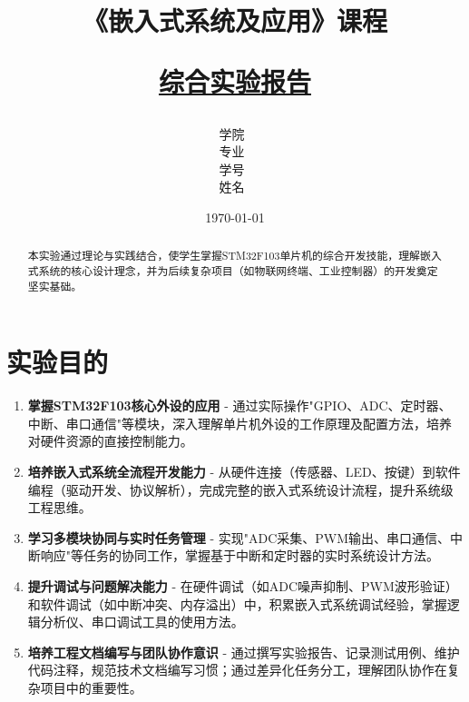 \documentclass[12pt,hyperref,a4paper,twoside,UTF8]{ctexart}
\title{ 
        \vspace{1cm}
        \heiti \Huge \textbf{《嵌入式系统及应用》课程} \par
        \vspace{1cm} 
        \heiti \Large {\underline{综合实验报告}}    
        \vspace{3cm}
    }
\author{
        \vspace{0.5cm}
        \kaishu\Large 学院\ \dlmu[9cm]{仪器科学与光电工程学院} \\ %
        \vspace{0.5cm}
        \kaishu\Large 专业\ \dlmu[9cm]{光电信息工程} \\ %
        \vspace{0.5cm}
        \kaishu\Large 学号\ \dlmu[9cm]{2024XXXXXX} \qquad  \\ %
        \vspace{0.5cm}
        \kaishu\Large 姓名\ \dlmu[9cm]{XXX} \qquad \\ %
    }
\date{\today} %
\begin{document}
\cover
\thispagestyle{empty} %
\newpage
\begin{abstract}

本实验通过理论与实践结合，使学生掌握STM32F103单片机的综合开发技能，理解嵌入式系统的核心设计理念，并为后续复杂项目（如物联网终端、工业控制器）的开发奠定坚实基础。

\end{abstract}

\thispagestyle{empty} %

\newpage
\tableofcontents

\newpage
\setcounter{page}{1} %


\section{实验目的}


\begin{enumerate}[label=\roman*.]


\item \textbf{掌握STM32F103核心外设的应用}   - 通过实际操作"GPIO、ADC、定时器、中断、串口通信"等模块，深入理解单片机外设的工作原理及配置方法，培养对硬件资源的直接控制能力。

\item \textbf{培养嵌入式系统全流程开发能力}   - 从硬件连接（传感器、LED、按键）到软件编程（驱动开发、协议解析），完成完整的嵌入式系统设计流程，提升系统级工程思维。

\item \textbf{学习多模块协同与实时任务管理}    - 实现"ADC采集、PWM输出、串口通信、中断响应"等任务的协同工作，掌握基于中断和定时器的实时系统设计方法。

\item \textbf{提升调试与问题解决能力}    - 在硬件调试（如ADC噪声抑制、PWM波形验证）和软件调试（如中断冲突、内存溢出）中，积累嵌入式系统调试经验，掌握逻辑分析仪、串口调试工具的使用方法。

\item \textbf{培养工程文档编写与团队协作意识}    - 通过撰写实验报告、记录测试用例、维护代码注释，规范技术文档编写习惯；通过差异化任务分工，理解团队协作在复杂项目中的重要性。

\end{enumerate}
\end{document}
